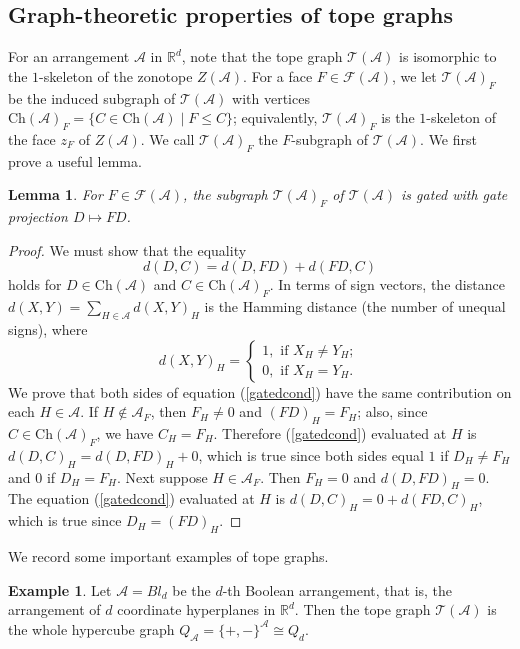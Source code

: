 \documentclass{amsart}
\numberwithin{equation}{section}
\theoremstyle{plain}
\newtheorem{lem}[thm]{Lemma}
\theoremstyle{remark}
\theoremstyle{definition}
\newtheorem{ex}[thm]{Example}
\numberwithin{equation}{section}
\newcommand{\A}{\mathcal{A}}
\newcommand{\T}{\mathcal{T}}
\newcommand{\FF}{\mathcal{F}}
\newcommand{\R}{\mathbb{R}}
\newcommand{\Ch}{\mathrm{Ch}}
\begin{document}
\subsection{Graph-theoretic properties of tope graphs}

For an arrangement $\A$ in $\R^d$, note that the tope graph $\T(\A)$ is isomorphic to the $1$-skeleton of the zonotope $Z(\A)$. For a face $F\in\FF(\A)$, we let $\T(\A)_F$ be the induced subgraph of $\T(\A)$ with vertices $\Ch(\A)_F=\{C\in\Ch(\A)\mid F\leq C\}$; equivalently, $\T(\A)_F$ is the $1$-skeleton of the face $z_F$ of $Z(\A)$. We call $\T(\A)_F$ the $F$-subgraph of $\T(\A)$. We first prove a useful lemma.

\begin{lem}\label{facegated}
    For $F\in\FF(\A)$, the subgraph $\T(\A)_F$ of $\T(\A)$ is gated with gate projection $D\mapsto FD$. 
\end{lem}
\begin{proof}
    We must show that the equality
    \begin{equation}
        d(D,C)=d(D,FD)+d(FD,C) \label{gatedcond}
    \end{equation}
    holds for $D\in \Ch(\A)$ and $C\in\Ch(\A)_F$. In terms of sign vectors, the distance $d(X,Y)=\sum_{H\in\A}d(X,Y)_H$ is the Hamming distance (the number of unequal signs), where
    \[
    d(X,Y)_H=\begin{cases}
        1,\text{ if }X_H\neq Y_H;\\
        0,\text{ if }X_H=Y_H.
    \end{cases}
    \]
    We prove that both sides of equation (\ref{gatedcond}) have the same contribution on each $H\in\A$. If $H\notin \A_F$, then $F_H\neq 0$ and $(FD)_H=F_H$; also, since $C\in\Ch(\A)_F$, we have $C_H=F_H$. Therefore (\ref{gatedcond}) evaluated at $H$ is $d(D,C)_H=d(D,FD)_H+0$, which is true since both sides equal $1$ if $D_H\neq F_H$ and $0$ if $D_H=F_H$. Next suppose $H\in \A_F$. Then $F_H=0$ and $d(D,FD)_H=0$. The equation (\ref{gatedcond}) evaluated at $H$ is $d(D,C)_H=0+d(FD,C)_H$, which is true since $D_H=(FD)_H$.
\end{proof}

We record some important examples of tope graphs.
\begin{ex}\label{topeboolean}
    Let $\A=Bl_d$ be the $d$-th Boolean arrangement, that is, the arrangement of $d$ coordinate hyperplanes in $\R^d$. Then the tope graph $\T(\A)$ is the whole hypercube graph $Q_{\A}=\{+,-\}^{\A}\cong Q_d$.
\end{ex}
\end{document}
